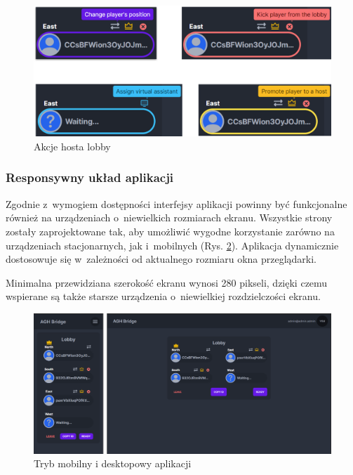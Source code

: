 \begin{figure}[h!]
  \centering
  \includegraphics[width=\textwidth]{img/widoki/host_actions.png}
  \caption{Akcje hosta lobby}
  \label{fig:host_actions_ui}
\end{figure}

\FloatBarrier

\subsubsection{Responsywny układ aplikacji}

Zgodnie z~wymogiem dostępności interfejsy aplikacji powinny
być funkcjonalne również na urządzeniach o~niewielkich
rozmiarach ekranu. Wszystkie strony zostały zaprojektowane
tak, aby umożliwić wygodne korzystanie zarówno na urządzeniach
stacjonarnych, jak i~mobilnych (Rys. \ref{fig:responsive_ui}). Aplikacja dynamicznie
dostosowuje się w~zależności od aktualnego rozmiaru okna
przeglądarki.

Minimalna przewidziana
szerokość ekranu wynosi 280 pikseli, dzięki czemu wspierane
są także starsze urządzenia o~niewielkiej rozdzielczości
ekranu.

\begin{figure}[h!]
  \centering
  \includegraphics[width=\textwidth]{img/widoki/desktop_mobile.png}
  \caption{Tryb mobilny i desktopowy aplikacji}
  \label{fig:responsive_ui}
\end{figure}

